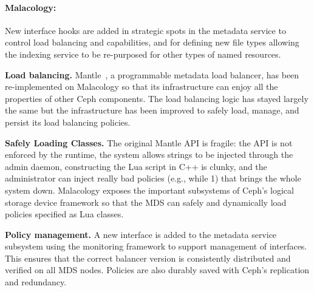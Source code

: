 \documentclass[preprint]{sigplanconf-eurosys}
\begin{document}

\paragraph*{Malacology:} New interface hooks are added in strategic spots in
the metadata service to control load balancing and capabilities, and for
defining new file types allowing the indexing service to be re-purposed for
other types of named resources.

{\bf Load balancing.} Mantle~\cite{sevilla:sc15-mantle}, a programmable
metadata load balancer, has been re-implemented on Malacology so that its
infrastructure can enjoy all the properties of other Ceph components. The load
balancing logic has stayed largely the same but the infrastructure has been
improved to safely load, manage, and persist its load balancing policies. 

{\bf Safely Loading Classes.} The original Mantle API is fragile: the API is
not enforced by the runtime, the system allows strings to be injected through
the admin daemon, constructing the Lua script in C++ is clunky, and the
administrator can inject really bad policies (e.g., while 1) that brings the
whole system down. Malacology exposes the important subsystems of Ceph's
logical storage device framework so that the MDS can safely and dynamically
load policies specified as Lua classes.

{\bf Policy management.} A new interface is added to the metadata service
subsystem using the monitoring framework to support management of interfaces.
This ensures that the correct balancer version is consistently distributed and
verified on all MDS nodes. Policies are also durably saved with Ceph's
replication and redundancy.
\end{document}
